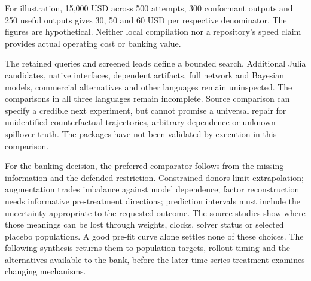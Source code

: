 For illustration, 15,000 USD across 500 attempts, 300 conformant outputs
and 250 useful outputs gives 30, 50 and 60 USD per respective denominator.
The figures are hypothetical. Neither local compilation nor a repository's
speed claim provides actual operating cost or banking value.
\citep{exec25_synthcross_choice}

The retained queries and screened leads define a bounded search. Additional
Julia candidates, native interfaces, dependent artifacts, full network and
Bayesian models, commercial alternatives and other languages remain
uninspected. The comparisons in all three languages remain incomplete. Source comparison
can specify a credible next experiment, but cannot promise a universal
repair for unidentified counterfactual trajectories, arbitrary dependence
or unknown spillover truth. The packages have not been validated by execution in this comparison.
\citep{exec25_synthcross_choice}

For the banking decision, the preferred comparator follows from the missing
information and the defended restriction. Constrained donors limit
extrapolation; augmentation trades imbalance against model dependence;
factor reconstruction needs informative pre-treatment directions; prediction
intervals must include the uncertainty appropriate to the requested outcome.
The source studies show where those meanings can be lost through weights,
clocks, solver status or selected placebo populations. A good pre-fit curve
alone settles none of these choices. The following synthesis returns them
to population targets, rollout timing and the alternatives available to the
bank, before the later time-series treatment examines changing mechanisms.


